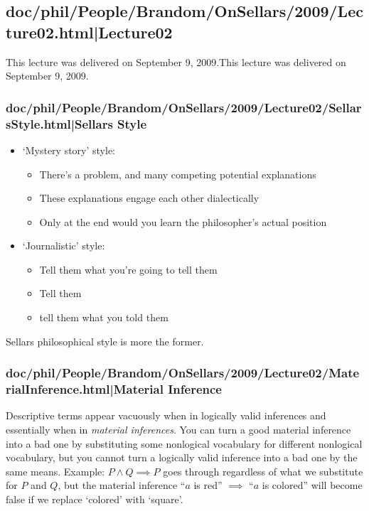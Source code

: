 \documentclass[12pt,a4paper]{report}
\begin{document}
\subsection{doc/phil/People/Brandom/OnSellars/2009/Lecture02.html|Lecture02}
This lecture was delivered on September 9, 2009.This lecture was delivered on September 9, 2009.

\subsubsection{doc/phil/People/Brandom/OnSellars/2009/Lecture02/SellarsStyle.html|Sellars Style}

\begin{itemize}
\item `Mystery story' style:
    \begin{itemize}
        \item There's a problem, and many competing potential explanations
        \item These explanations engage each other dialectically
        \item Only at the end would you learn the philosopher's actual position
    \end{itemize}
\item `Journalistic' style:
    \begin{itemize}
        \item Tell them what you're going to tell them
        \item Tell them
        \item tell them what you told them
    \end{itemize}
\end{itemize}

Sellars philosophical style is more the former.
\subsubsection{doc/phil/People/Brandom/OnSellars/2009/Lecture02/MaterialInference.html|Material Inference}

Descriptive terms appear vacuously when in logically valid inferences and essentially when in \emph{material inferences}. You can turn a good material inference into a bad one by substituting some nonlogical vocabulary for different nonlogical vocabulary, but you cannot turn a logically valid inference into a bad one by the same means. Example: $P \land Q \implies P$ goes through regardless of what we substitute for $P$ and $Q$, but the material inference ``$a$ is red'' $\implies$ ``$a$ is colored'' will become false if we replace `colored' with `square'.
\end{document}
